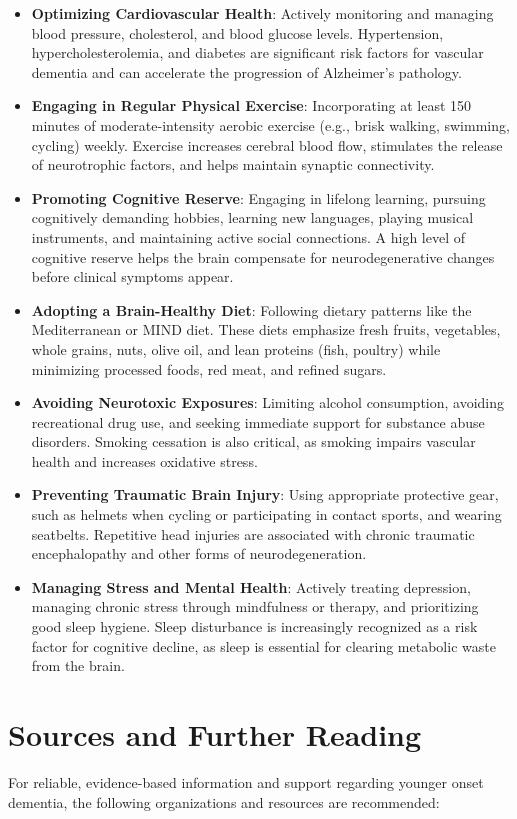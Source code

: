 \begin{itemize}
    \item \textbf{Optimizing Cardiovascular Health}: Actively monitoring and managing blood pressure, cholesterol, and blood glucose levels. Hypertension, hypercholesterolemia, and diabetes are significant risk factors for vascular dementia and can accelerate the progression of Alzheimer's pathology.
    \item \textbf{Engaging in Regular Physical Exercise}: Incorporating at least 150 minutes of moderate-intensity aerobic exercise (e.g., brisk walking, swimming, cycling) weekly. Exercise increases cerebral blood flow, stimulates the release of neurotrophic factors, and helps maintain synaptic connectivity.
    \item \textbf{Promoting Cognitive Reserve}: Engaging in lifelong learning, pursuing cognitively demanding hobbies, learning new languages, playing musical instruments, and maintaining active social connections. A high level of cognitive reserve helps the brain compensate for neurodegenerative changes before clinical symptoms appear.
    \item \textbf{Adopting a Brain-Healthy Diet}: Following dietary patterns like the Mediterranean or MIND diet. These diets emphasize fresh fruits, vegetables, whole grains, nuts, olive oil, and lean proteins (fish, poultry) while minimizing processed foods, red meat, and refined sugars.
    \item \textbf{Avoiding Neurotoxic Exposures}: Limiting alcohol consumption, avoiding recreational drug use, and seeking immediate support for substance abuse disorders. Smoking cessation is also critical, as smoking impairs vascular health and increases oxidative stress.
    \item \textbf{Preventing Traumatic Brain Injury}: Using appropriate protective gear, such as helmets when cycling or participating in contact sports, and wearing seatbelts. Repetitive head injuries are associated with chronic traumatic encephalopathy and other forms of neurodegeneration.
    \item \textbf{Managing Stress and Mental Health}: Actively treating depression, managing chronic stress through mindfulness or therapy, and prioritizing good sleep hygiene. Sleep disturbance is increasingly recognized as a risk factor for cognitive decline, as sleep is essential for clearing metabolic waste from the brain.
\end{itemize}

\section*{Sources and Further Reading}
For reliable, evidence-based information and support regarding younger onset dementia, the following organizations and resources are recommended:

